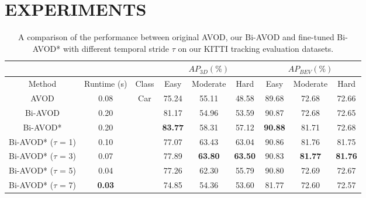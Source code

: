 \documentclass[letterpaper, 10 pt, conference]{ieeeconf}  %
\begin{document}
\section{EXPERIMENTS}


\begin{table}\centering
	\begin{tabular}{ccccccccc}
		&   		   &  											& \multicolumn{3}{c}{$AP_{3D}(\%)$}  		    & \multicolumn{3}{c}{$AP_{BEV}(\%)$} \\ \toprule[1.5pt]
		Method   & Runtime (s) & \multicolumn{1}{c|}{Class}  				& Easy & Moderate & \multicolumn{1}{c|}{Hard}  & Easy   & Moderate     & Hard    \\ \midrule
		AVOD\cite{ku2018joint}     & 0.08        & \multicolumn{1}{c|}{\multirow{7}{*}{Car}}  & 75.24 & 55.11   & \multicolumn{1}{c|}{48.58} & 89.68  & 72.68        & 72.66   \\
		Bi-AVOD  & 0.20        & \multicolumn{1}{c|}{}                      & 81.17 & 54.96   & \multicolumn{1}{c|}{53.59} & 90.87  & 72.68        & 72.65   \\
		Bi-AVOD* & 0.20        & \multicolumn{1}{c|}{}    & \textbf{83.77}  & 58.31  & \multicolumn{1}{c|}{57.12} & \textbf{90.88} & 81.71 & 72.68  \\
		Bi-AVOD* ($\tau$ = 1)  & 0.10  & \multicolumn{1}{c|}{}      & 77.07 & 63.43     & \multicolumn{1}{c|}{63.04} & 90.86    & 81.76        & 81.75     \\
		Bi-AVOD* ($\tau$ = 3)  & 0.07  & \multicolumn{1}{c|}{}      & 77.89 & \textbf{63.80} & \multicolumn{1}{c|}{\textbf{63.50}} & 90.83    & \textbf{81.77}    & \textbf{81.76}  \\
		Bi-AVOD* ($\tau$ = 5)  & 0.04  & \multicolumn{1}{c|}{}      & 77.26 & 62.30     & \multicolumn{1}{c|}{55.79} & 90.80    & 72.69        & 72.67     \\
		Bi-AVOD* ($\tau$ = 7)  & \textbf{0.03} & \multicolumn{1}{c|}{}      & 74.85 & 54.36   & \multicolumn{1}{c|}{53.60} & 81.77    & 72.60        & 72.57 \\
		\bottomrule[1.5pt]
	\end{tabular}
	\caption{A comparison of the performance between original AVOD, our Bi-AVOD and fine-tuned Bi-AVOD* 
		with different temporal stride $\tau$ on our KITTI tracking evaluation datasets.}
	\label{table:result_detection}
\end{table}
\end{document}
